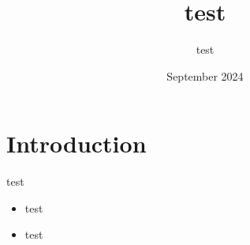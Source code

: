 \documentclass{article}
\title{test}
\author{test}
\date{September 2024}
\begin{document}
\maketitle

\section{Introduction}

test

\begin{itemize}
    \item test
    \item test
\end{itemize}
\end{document}
